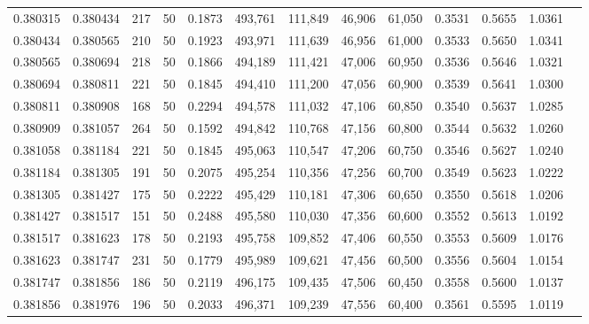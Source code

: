 \begin{tabular}{rrrrrrrrrrrrr}
0.380315 & 0.380434 &   217 &  50 &                                     0.1873 & 493,761 & 111,849 &  46,906 &  61,050 & 0.3531 & 0.5655 & 1.0361 \\
0.380434 & 0.380565 &   210 &  50 &                                     0.1923 & 493,971 & 111,639 &  46,956 &  61,000 & 0.3533 & 0.5650 & 1.0341 \\
0.380565 & 0.380694 &   218 &  50 &                                     0.1866 & 494,189 & 111,421 &  47,006 &  60,950 & 0.3536 & 0.5646 & 1.0321 \\
0.380694 & 0.380811 &   221 &  50 &                                     0.1845 & 494,410 & 111,200 &  47,056 &  60,900 & 0.3539 & 0.5641 & 1.0300 \\
0.380811 & 0.380908 &   168 &  50 &                                     0.2294 & 494,578 & 111,032 &  47,106 &  60,850 & 0.3540 & 0.5637 & 1.0285 \\
0.380909 & 0.381057 &   264 &  50 &                                     0.1592 & 494,842 & 110,768 &  47,156 &  60,800 & 0.3544 & 0.5632 & 1.0260 \\
0.381058 & 0.381184 &   221 &  50 &                                     0.1845 & 495,063 & 110,547 &  47,206 &  60,750 & 0.3546 & 0.5627 & 1.0240 \\
0.381184 & 0.381305 &   191 &  50 &                                     0.2075 & 495,254 & 110,356 &  47,256 &  60,700 & 0.3549 & 0.5623 & 1.0222 \\
0.381305 & 0.381427 &   175 &  50 &                                     0.2222 & 495,429 & 110,181 &  47,306 &  60,650 & 0.3550 & 0.5618 & 1.0206 \\
0.381427 & 0.381517 &   151 &  50 &                                     0.2488 & 495,580 & 110,030 &  47,356 &  60,600 & 0.3552 & 0.5613 & 1.0192 \\
0.381517 & 0.381623 &   178 &  50 &                                     0.2193 & 495,758 & 109,852 &  47,406 &  60,550 & 0.3553 & 0.5609 & 1.0176 \\
0.381623 & 0.381747 &   231 &  50 &                                     0.1779 & 495,989 & 109,621 &  47,456 &  60,500 & 0.3556 & 0.5604 & 1.0154 \\
0.381747 & 0.381856 &   186 &  50 &                                     0.2119 & 496,175 & 109,435 &  47,506 &  60,450 & 0.3558 & 0.5600 & 1.0137 \\
0.381856 & 0.381976 &   196 &  50 &                                     0.2033 & 496,371 & 109,239 &  47,556 &  60,400 & 0.3561 & 0.5595 & 1.0119 \\

\end{tabular}
